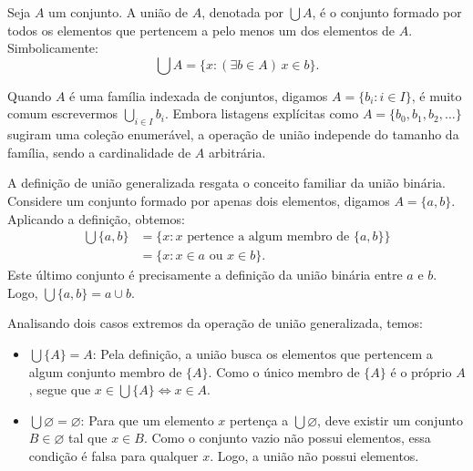 \begin{definicao}
    \label{def:uniao}
    Seja \(A\) um conjunto. A união de \(A\), denotada por \(\bigcup A\), é o conjunto formado por todos os elementos que pertencem a pelo menos um dos elementos de \(A\). Simbolicamente:
    \[
        \bigcup A = \{x : (\exists b \in A) \, x \in b\}.
    \]
\end{definicao}

\begin{remark}
    Quando \(A\) é uma família indexada de conjuntos, digamos \(A = \{b_i : i \in I\}\), é muito comum escrevermos \(\bigcup_{i \in I} b_i\). Embora listagens explícitas como \(A = \{b_0, b_1, b_2, \dots\}\) sugiram uma coleção enumerável, a operação de união independe do tamanho da família, sendo a cardinalidade de \(A\) arbitrária.
\end{remark}

\begin{exemplo}
    A definição de união generalizada resgata o conceito familiar da união binária. Considere um conjunto formado por apenas dois elementos, digamos \(A = \{a, b\}\). Aplicando a definição, obtemos:
    \begin{align*}
        \bigcup \{a, b\} & = \{x : x \text{ pertence a algum membro de } \{a, b\}\} \\
                         & = \{x : x \in a \text{ ou } x \in b\}.
    \end{align*}
    Este último conjunto é precisamente a definição da união binária entre \(a\) e \(b\). Logo, \(\bigcup \{a, b\} = a \cup b\).
\end{exemplo}

\begin{exemplo}
    Analisando dois casos extremos da operação de união generalizada, temos:
    \begin{itemize}
        \item \(\bigcup \{A\} = A\): Pela definição, a união busca os elementos que pertencem a algum conjunto membro de \(\{A\}\). Como o único membro de \(\{A\}\) é o próprio \(A\), segue que \(x \in \bigcup \{A\} \iff x \in A\).
        \item \(\bigcup \varnothing = \varnothing\): Para que um elemento \(x\) pertença a \(\bigcup \varnothing\), deve existir um conjunto \(B \in \varnothing\) tal que \(x \in B\). Como o conjunto vazio não possui elementos, essa condição é falsa para qualquer \(x\). Logo, a união não possui elementos.
    \end{itemize}
\end{exemplo}

